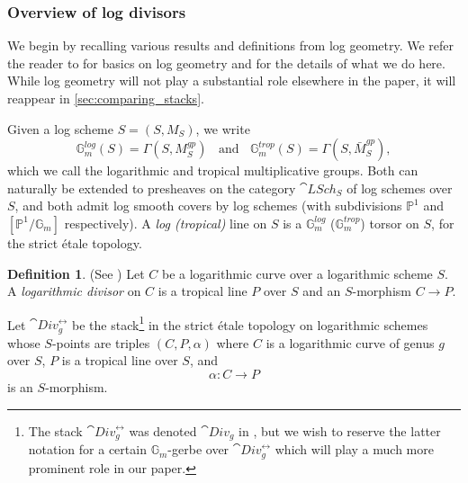 \documentclass[a4paper,12pt]{article} %
\newcommand{\bb}[1]{{\mathbb{#1}}}
\theoremstyle{definition}
\newtheorem{definition}{Definition} %
\theoremstyle{plain}%
\begin{document}

\subsubsection{Overview of log divisors}

We begin by recalling various results and definitions from log geometry. We refer the reader to \cite{Kato1989Logarithmic-str} for basics on log geometry and \cite{Marcus2017Logarithmic-com} for the details of what we do here. 
While log geometry will not play a substantial role elsewhere in the paper, 
it will reappear in \cref{sec:comparing_stacks}. 


Given a log scheme $S = (S, M_S)$, we write
\begin{equation*}
\mathbb G_m^{log}(S) = \Gamma(S, M_S^{gp})
\ \ \ \ 
\text{and} \ \ \ \  
\mathbb G_m^{trop}(S) = \Gamma(S, \bar M_S^{gp}), 
\end{equation*}
which we call the logarithmic and tropical multiplicative groups.  Both can naturally be extended to presheaves on the category $\cat{LSch}_S$ of log schemes over $S$,
and both
admit log smooth covers by log schemes (with subdivisions $\bb P^1$ and $[\bb P^1/\bb G_m]$ respectively). A \emph{log (tropical)} line on $S$ is a $\bb G_m^{log}$ ($\bb G_m^{trop}$) torsor on $S$, for the strict \'etale topology. 


\begin{definition}(See \cite[Def. 4.6]{Marcus2017Logarithmic-com}) 
\label{Def:logdivisor}%
Let $C$ be a logarithmic curve over a logarithmic scheme $S$. A \emph{logarithmic divisor} on $C$ is a tropical line $P$ over $S$ and an $S$-morphism $C \to P$. 

Let $\cat{Div}^{\rel}_g$ be the stack{\footnote{The stack $\cat{Div}^{\rel}_g$ was denoted $\cat{Div}_g$ in \cite{Marcus2017Logarithmic-com}, but we wish to reserve the
latter notation for a certain $\bb G_m$-gerbe over $\cat{Div}^{\rel}_g$ which will play a much more prominent role in our paper.}} 
in the strict \'etale topology on logarithmic schemes whose $S$-points are triples $(C, P, \alpha)$ where $C$ is a logarithmic curve of genus $g$ over $S$, $P$ is a tropical line over $S$, and 
$$\alpha \colon  C \to P$$ is an $S$-morphism. 
\end{definition}
\end{document}
